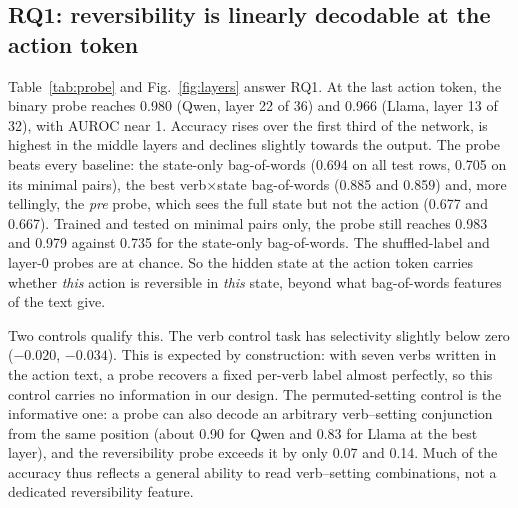 \documentclass[conference]{IEEEtran}
\begin{document}
\subsection{RQ1: reversibility is linearly decodable at the action token}
Table~\ref{tab:probe} and Fig.~\ref{fig:layers} answer RQ1. At the last action token, the binary probe reaches 0.980 (Qwen, layer 22 of 36) and 0.966 (Llama, layer 13 of 32), with AUROC near 1. Accuracy rises over the first third of the network, is highest in the middle layers and declines slightly towards the output. The probe beats every baseline: the state-only bag-of-words (0.694 on all test rows, 0.705 on its minimal pairs), the best verb$\times$state bag-of-words (0.885 and 0.859) and, more tellingly, the \emph{pre} probe, which sees the full state but not the action (0.677 and 0.667). Trained and tested on minimal pairs only, the probe still reaches 0.983 and 0.979 against 0.735 for the state-only bag-of-words. The shuffled-label and layer-0 probes are at chance. So the hidden state at the action token carries whether \emph{this} action is reversible in \emph{this} state, beyond what bag-of-words features of the text give.

Two controls qualify this. The verb control task has selectivity slightly below zero ($-0.020$, $-0.034$). This is expected by construction: with seven verbs written in the action text, a probe recovers a fixed per-verb label almost perfectly, so this control carries no information in our design. The permuted-setting control is the informative one: a probe can also decode an arbitrary verb--setting conjunction from the same position (about 0.90 for Qwen and 0.83 for Llama at the best layer), and the reversibility probe exceeds it by only 0.07 and 0.14. Much of the accuracy thus reflects a general ability to read verb--setting combinations, not a dedicated reversibility feature.
\end{document}
